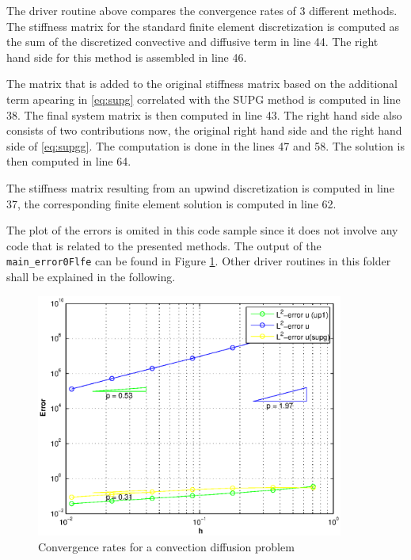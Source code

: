 The driver routine above compares the convergence rates of 3 different methods. The stiffness matrix for the standard finite element discretization is computed as the sum of the discretized convective and diffusive term in line 44. The right hand side for this method is assembled in line 46.



The matrix that is added to the original stiffness matrix based on the additional term apearing in \eqref{eq:supg} correlated with the SUPG method is computed in line 38. The final system matrix is then computed in line 43. The right hand side also consists of two contributions now, the original right hand side and the right hand side of \eqref{eq:supgg}. The computation is done in the lines 47 and 58. The solution is then computed in line 64.


The stiffness matrix resulting from an upwind discretization is computed in line 37, the corresponding finite element solution is computed in line 62.

The plot of the errors is omited in this code sample since it does not involve any code that is related to the presented methods. The output of the \texttt{main\_error0Flfe} can be found in Figure \ref{fig:convdiff}. Other driver routines in this folder shall be explained in the following.

\begin{figure}[htb]
  \centering
  \includegraphics[width=0.9\textwidth]{main_error0Flfe.eps}
  \caption{Convergence rates for a convection diffusion problem}
  \label{fig:convdiff}
\end{figure}

